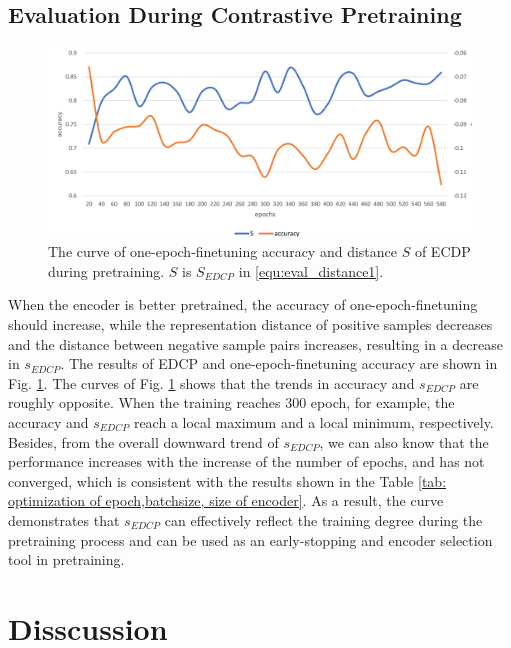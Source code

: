 \documentclass[conference]{IEEEtran}
\begin{document}
\subsection{Evaluation During Contrastive Pretraining}
\begin{figure}[tb]
    \centering
    \includegraphics[scale=0.27]{images/edcp.png}
    \caption{The curve of one-epoch-finetuning accuracy and distance $S$ of ECDP during pretraining. $S$ is $S_{EDCP}$ in \eqref{equ:eval_distance1}.}
    \label{fig:evaluation tool}
\end{figure}
When the encoder is better pretrained, the accuracy of one-epoch-finetuning should increase, while the representation distance of positive samples decreases and the distance between negative sample pairs increases, resulting in a decrease in $s_{EDCP}$. The results of EDCP and one-epoch-finetuning accuracy are shown in Fig. \ref{fig:evaluation tool}. The curves of Fig. \ref{fig:evaluation tool} shows that the trends in accuracy and $s_{EDCP}$ are roughly opposite. When the training reaches 300 epoch, for example, the accuracy and $s_{EDCP}$ reach a local maximum and a local minimum, respectively. Besides, from the overall downward trend of $s_{EDCP}$, we can also know that the performance increases with the increase of the number of epochs, and has not converged, which is consistent with the results shown in the Table \ref{tab: optimization of epoch,batchsize, size of encoder}.
As a result, the curve demonstrates that $s_{EDCP}$ can effectively reflect the training degree during the pretraining process and can be used as an early-stopping and encoder selection tool in pretraining.

\section{Disscussion}
\end{document}
